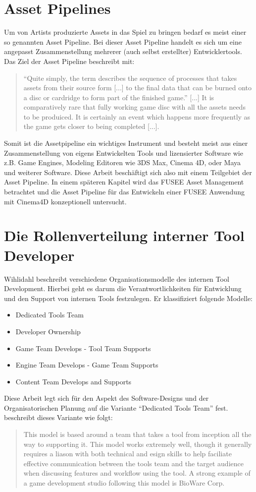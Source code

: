\documentclass[pagesize, paper=a4, fontsize=12pt,titlepage=true, headings=small, headnosepline, abstractoff, liststotoc, nochapterprefix, plainheadsepline, twoside]{scrreprt}
\begin{document}
\section{Asset Pipelines}
Um von Artists produzierte Assets in das Spiel zu bringen bedarf es meist einer so genannten Asset Pipeline. Bei dieser Asset Pipeline handelt es sich um eine angepasst Zusammenstellung mehrerer (auch selbst erstellter) Entwicklertools. Das Ziel der Asset Pipeline beschreibt \autocite{Carter2004} mit:
\begin{quote}
“Quite simply, the term describes the sequence of processes that takes assets from their source form [...] to the final data that can be burned onto a disc or cardridge to form part of the finished game.”
[...]
It is comparatively rare that fully working game disc with all the assets needs to be produiced. It is certainly an event which happens more frequently as the game gets closer to being completed [...]. 
\end{quote}
Somit ist die Assetpipeline ein wichtiges Instrument und besteht meist aus einer Zusammenstellung von eigens Entwickelten Tools und lizensierter Software wie z.B. Game Engines, Modeling Editoren wie 3DS Max, Cinema 4D, oder Maya und weiterer Software. Diese Arbeit beschäftigt sich also mit einem Teilgebiet der Asset Pipeline. In einem späteren Kapitel wird das FUSEE Asset Management betrachtet und die Asset Pipeline für das Entwickeln einer FUSEE Anwendung mit Cinema4D konzeptionell untersucht.

\section{Die Rollenverteilung interner Tool Developer}
Wihlidahl \autocite[S. 5]{Wihlidal2006} beschreibt verschiedene Organisationsmodelle des internen Tool Development. Hierbei geht es darum die Verantwortlichkeiten für Entwicklung und den Support von internen Tools festzulegen. Er klassifiziert folgende Modelle:
\begin{itemize}
\item Dedicated Tools Team
\item Developer Ownership
\item Game Team Develops - Tool Team Supports
\item Engine Team Develops - Game Team Supports
\item Content Team Develops and Supports
\end{itemize}

Diese Arbeit legt sich für den Aspekt des Software-Designs und der Organisatorischen Planung auf die Variante “Dedicated Tools Team” fest. \autocite{Wihlidal2006} beschreibt dieses Variante wie folgt:
\begin{quote}
This model is based around a team that takes a tool from inception all the way to supporting it. This model works extremely well, though it generally requires a liason with both technical and esign skills to help faciliate effective communication between the tools team and the target audience when discussing features and workflow using the tool. A strong example of a game development studio following this model is BioWare Corp. \autocite[5]{Wihlidal2006}
\end{quote}
\end{document}
